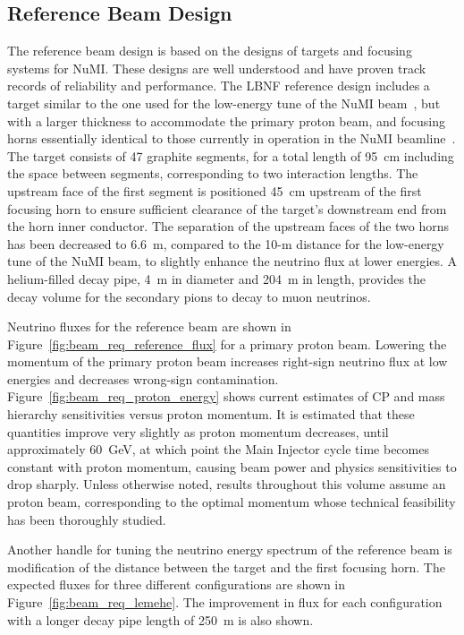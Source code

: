 \subsection{Reference Beam Design}
\label{sec:reference-design-focusing-system}
The reference beam design is based on the designs of targets and
focusing systems for NuMI. These designs are well understood and have
proven track records of reliability and performance. The LBNF
reference design includes a target similar to the one used for the
low-energy tune of the NuMI beam~\cite{numitdr}, but with a larger
thickness to accommodate the  primary proton beam, and focusing
horns essentially identical to those currently in operation in the
NuMI beamline~\cite{numitdr}. The target consists of 47 graphite
segments, for a total length of 95~cm including the space between
segments, corresponding to two interaction lengths. The upstream face
of the first segment is positioned 45~cm upstream of the first
focusing horn to ensure sufficient clearance of the target's
downstream end from the horn inner conductor. The separation of the
upstream faces of the two horns has been decreased to 6.6~m, compared
to the 10-m distance for the low-energy tune of the NuMI beam, to
slightly enhance the neutrino flux at lower energies. A helium-filled
decay pipe, 4~m in diameter and 204~m in length, provides the decay
volume for the secondary pions to decay to muon neutrinos.

Neutrino fluxes for the reference beam are shown in
Figure~\ref{fig:beam_req_reference_flux} for a  primary proton
beam.  Lowering the momentum of the primary proton beam increases
right-sign neutrino flux at low energies and decreases wrong-sign
contamination.  Figure~\ref{fig:beam_req_proton_energy} shows current
estimates of CP and mass hierarchy sensitivities versus proton
momentum. It is estimated that these quantities improve very slightly as
proton momentum decreases, until approximately 60~GeV, at which point the Main
Injector cycle time becomes constant with proton momentum, causing
beam power and physics sensitivities to drop sharply.  Unless
otherwise noted, results throughout this volume assume an 
proton beam, corresponding to the optimal momentum whose technical
feasibility has been thoroughly studied.

Another handle for tuning the neutrino energy
spectrum of the reference beam is modification of the distance between
the target and the first focusing horn.  The expected fluxes for three
different configurations are shown in
Figure~\ref{fig:beam_req_lemehe}. The improvement in flux for each configuration with a longer decay pipe length of 250~m is also shown.

